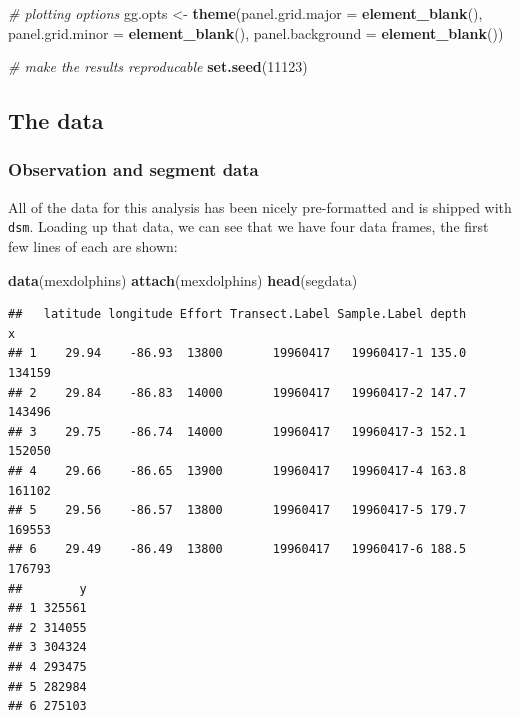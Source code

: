 \documentclass[]{amsart}
\newenvironment{Shaded}{}{}
\newcommand{\KeywordTok}[1]{\textcolor[rgb]{0.00,0.44,0.13}{\textbf{{#1}}}}
\newcommand{\DataTypeTok}[1]{\textcolor[rgb]{0.56,0.13,0.00}{{#1}}}
\newcommand{\DecValTok}[1]{\textcolor[rgb]{0.25,0.63,0.44}{{#1}}}
\newcommand{\StringTok}[1]{\textcolor[rgb]{0.25,0.44,0.63}{{#1}}}
\newcommand{\CommentTok}[1]{\textcolor[rgb]{0.38,0.63,0.69}{\textit{{#1}}}}
\newcommand{\NormalTok}[1]{{#1}}
\begin{document}
\begin{Shaded}
\begin{Highlighting}[]

\CommentTok{# plotting options}
\NormalTok{gg.opts <-}\StringTok{ }\KeywordTok{theme}\NormalTok{(}\DataTypeTok{panel.grid.major =} \KeywordTok{element_blank}\NormalTok{(), }\DataTypeTok{panel.grid.minor =} \KeywordTok{element_blank}\NormalTok{(), }
    \DataTypeTok{panel.background =} \KeywordTok{element_blank}\NormalTok{())}

\CommentTok{# make the results reproducable}
\KeywordTok{set.seed}\NormalTok{(}\DecValTok{11123}\NormalTok{)}
\end{Highlighting}
\end{Shaded}

\subsection{The data}

\subsubsection{Observation and segment data}

All of the data for this analysis has been nicely pre-formatted and is
shipped with \texttt{dsm}. Loading up that data, we can see that we have
four data frames, the first few lines of each are shown:

\begin{Shaded}
\begin{Highlighting}[]
\KeywordTok{data}\NormalTok{(mexdolphins)}
\KeywordTok{attach}\NormalTok{(mexdolphins)}
\KeywordTok{head}\NormalTok{(segdata)}
\end{Highlighting}
\end{Shaded}

\begin{verbatim}
##   latitude longitude Effort Transect.Label Sample.Label depth      x
## 1    29.94    -86.93  13800       19960417   19960417-1 135.0 134159
## 2    29.84    -86.83  14000       19960417   19960417-2 147.7 143496
## 3    29.75    -86.74  14000       19960417   19960417-3 152.1 152050
## 4    29.66    -86.65  13900       19960417   19960417-4 163.8 161102
## 5    29.56    -86.57  13800       19960417   19960417-5 179.7 169553
## 6    29.49    -86.49  13800       19960417   19960417-6 188.5 176793
##        y
## 1 325561
## 2 314055
## 3 304324
## 4 293475
## 5 282984
## 6 275103
\end{verbatim}
\end{document}
